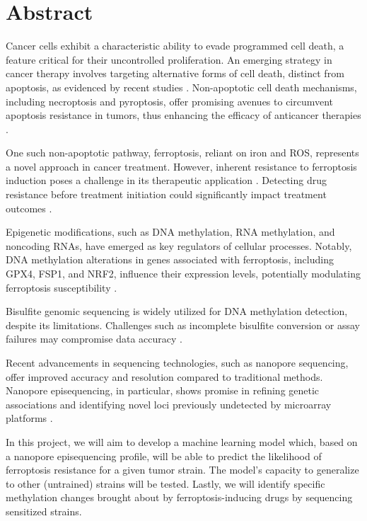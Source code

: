 \chapter{Abstract}

Cancer cells exhibit a characteristic ability to evade programmed cell death, a feature critical for their uncontrolled proliferation. An emerging strategy in cancer therapy involves targeting alternative forms of cell death, distinct from apoptosis, as evidenced by recent studies \citep{non-apoptotic2}. Non-apoptotic cell death mechanisms, including necroptosis and pyroptosis, offer promising avenues to circumvent apoptosis resistance in tumors, thus enhancing the efficacy of anticancer therapies \citep{non-apoptotic}.

One such non-apoptotic pathway, ferroptosis, reliant on iron and \ac{ROS}, represents a novel approach in cancer treatment. However, inherent resistance to ferroptosis induction poses a challenge in its therapeutic application \citep{resistance}. Detecting drug resistance before treatment initiation could significantly impact treatment outcomes \citep{prediction}.

Epigenetic modifications, such as DNA methylation, RNA methylation, and noncoding RNAs, have emerged as key regulators of cellular processes. Notably, DNA methylation alterations in genes associated with ferroptosis, including GPX4, FSP1, and NRF2, influence their expression levels, potentially modulating ferroptosis susceptibility \citep{methylation}.

Bisulfite genomic sequencing is widely utilized for DNA methylation detection, despite its limitations. Challenges such as incomplete bisulfite conversion or assay failures may compromise data accuracy \citep{bisulfite2, bisulfite}.

Recent advancements in sequencing technologies, such as nanopore sequencing, offer improved accuracy and resolution compared to traditional methods. Nanopore episequencing, in particular, shows promise in refining genetic associations and identifying novel loci previously undetected by microarray platforms \citep{npepi, npepi2}.

In this project, we will aim to develop a machine learning model which, based on a nanopore episequencing profile, will be able to predict the likelihood of ferroptosis resistance for a given tumor strain. The model's capacity to generalize to other (untrained) strains will be tested. Lastly, we will identify specific methylation changes brought about by ferroptosis-inducing drugs by sequencing sensitized strains.